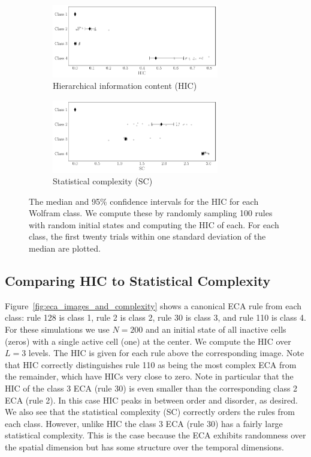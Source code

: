 \begin{figure}[ht!]
\centering
\begin{subfigure}{\textwidth}
    \centering
    \includegraphics[width=0.8\textwidth]{figures/hic_by_class}
    \caption{Hierarchical information content (HIC)}
    \label{fig:hic_by_class}
\end{subfigure}
\begin{subfigure}{\textwidth}
    \centering
    \includegraphics[width=0.8\textwidth]{figures/sc_by_class}
    \caption{Statistical complexity (SC)}
    \label{fig:sc_by_class}
\end{subfigure}
\caption{The median and 95\% confidence intervals for the HIC for each Wolfram
    class. We compute these by randomly sampling 100 rules with random initial
    states and computing the HIC of each. For each class, the first twenty
    trials within one standard deviation of the median are plotted.}
\label{fig:complexity_by_class}
\end{figure}


\subsection{Comparing HIC to Statistical Complexity}

Figure~\ref{fig:eca_images_and_complexity} shows a canonical ECA rule from each
class: rule 128 is class 1, rule 2 is class 2, rule 30 is class 3, and rule 110
is class 4. For these simulations we use $N\!=\!200$ and an initial state of all
inactive cells (zeros) with a single active cell (one) at the center. We
compute the HIC over $L\!=\!3$ levels. The HIC is given for each rule above the
corresponding image. Note that HIC correctly distinguishes rule 110 as being
the most complex ECA from the remainder, which have HICs very close to zero.
Note in particular that the HIC of the class 3 ECA (rule 30) is even smaller
than the corresponding class 2 ECA (rule 2). In this case HIC peaks in between
order and disorder, as desired. We also see that the statistical complexity
(SC) correctly orders the rules from each class. However, unlike HIC the class
3 ECA (rule 30) has a fairly large statistical complexity. This is the case
because the ECA exhibits randomness over the spatial dimension but has some
structure over the temporal dimensions.

